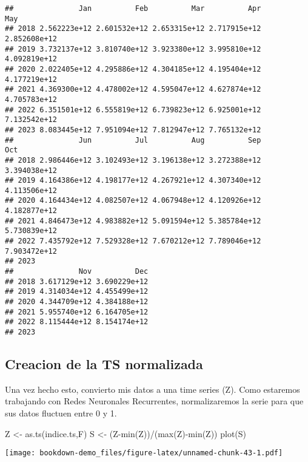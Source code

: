 \documentclass[
]{book}
\newenvironment{Shaded}{\begin{snugshade}}{\end{snugshade}}
\newcommand{\FunctionTok}[1]{\textcolor[rgb]{0.00,0.00,0.00}{#1}}
\newcommand{\NormalTok}[1]{#1}
\newcommand{\OtherTok}[1]{\textcolor[rgb]{0.56,0.35,0.01}{#1}}
\newcommand{\SpecialCharTok}[1]{\textcolor[rgb]{0.00,0.00,0.00}{#1}}
\begin{document}
\begin{verbatim}
##               Jan          Feb          Mar          Apr          May
## 2018 2.562223e+12 2.601532e+12 2.653315e+12 2.717915e+12 2.852608e+12
## 2019 3.732137e+12 3.810740e+12 3.923380e+12 3.995810e+12 4.092819e+12
## 2020 2.022405e+12 4.295886e+12 4.304185e+12 4.195404e+12 4.177219e+12
## 2021 4.369300e+12 4.478002e+12 4.595047e+12 4.627874e+12 4.705783e+12
## 2022 6.351501e+12 6.555819e+12 6.739823e+12 6.925001e+12 7.132542e+12
## 2023 8.083445e+12 7.951094e+12 7.812947e+12 7.765132e+12             
##               Jun          Jul          Aug          Sep          Oct
## 2018 2.986446e+12 3.102493e+12 3.196138e+12 3.272388e+12 3.394038e+12
## 2019 4.164386e+12 4.198177e+12 4.267921e+12 4.307340e+12 4.113506e+12
## 2020 4.164434e+12 4.082507e+12 4.067948e+12 4.120926e+12 4.182877e+12
## 2021 4.846473e+12 4.983882e+12 5.091594e+12 5.385784e+12 5.730839e+12
## 2022 7.435792e+12 7.529328e+12 7.670212e+12 7.789046e+12 7.903472e+12
## 2023                                                                 
##               Nov          Dec
## 2018 3.617129e+12 3.690229e+12
## 2019 4.314034e+12 4.455499e+12
## 2020 4.344709e+12 4.384188e+12
## 2021 5.955740e+12 6.164705e+12
## 2022 8.115444e+12 8.154174e+12
## 2023
\end{verbatim}

\hypertarget{creacion-de-la-ts-normalizada}{%
\subsection{Creacion de la TS normalizada}\label{creacion-de-la-ts-normalizada}}

Una vez hecho esto, convierto mis datos a una time series (Z). Como estaremos trabajando con Redes Neuronales Recurrentes, normalizaremos la serie para que sus datos fluctuen entre 0 y 1.

\begin{Shaded}
\begin{Highlighting}[]
\NormalTok{Z }\OtherTok{\textless{}{-}} \FunctionTok{as.ts}\NormalTok{(indice.ts,F)}
\NormalTok{S }\OtherTok{\textless{}{-}}\NormalTok{ (Z}\SpecialCharTok{{-}}\FunctionTok{min}\NormalTok{(Z))}\SpecialCharTok{/}\NormalTok{(}\FunctionTok{max}\NormalTok{(Z)}\SpecialCharTok{{-}}\FunctionTok{min}\NormalTok{(Z))}
\FunctionTok{plot}\NormalTok{(S)}
\end{Highlighting}
\end{Shaded}

\texttt{[image: bookdown-demo\_files/figure-latex/unnamed-chunk-43-1.pdf]}
\end{document}
